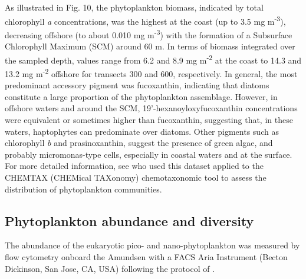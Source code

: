 \documentclass[essd, manuscript]{copernicus}
\begin{document}
As illustrated in Fig. 10, the phytoplankton biomass, indicated by total chlorophyll \textit{a} concentrations, was the highest at the coast (up to 3.5 mg m\textsuperscript{-3}), decreasing offshore (to about 0.010 mg m\textsuperscript{-3})  with the formation of a Subsurface Chlorophyll Maximum (SCM) around 60 m. In terms of biomass integrated over the sampled depth, values range from 6.2 and 8.9 mg m\textsuperscript{-2} at the coast to 14.3 and 13.2 mg m\textsuperscript{-2} offshore for transects 300 and 600, respectively. In general, the most predominant accessory pigment was fucoxanthin, indicating that diatoms constitute a large proportion of the phytoplankton assemblage. However, in offshore waters and around the SCM, 19’-hexanoyloxyfucoxanthin concentrations were equivalent or sometimes higher than fucoxanthin, suggesting that, in these waters, haptophytes can predominate over diatoms. Other pigments such as chlorophyll \textit{b} and prasinoxanthin, suggest the presence of green algae, and probably micromonas-type cells, especially in coastal waters and at the surface. For more detailed information, see \citet{Coupel2015} who used this dataset applied to the CHEMTAX (CHEMical TAXonomy) chemotaxonomic tool to assess the distribution of phytoplankton communities.

\subsection{Phytoplankton abundance and diversity}

The abundance of the eukaryotic pico- and nano-phytoplankton was measured by flow cytometry onboard the Amundsen with a FACS Aria Instrument (Becton Dickinson, San Jose, CA, USA) following the protocol of \citet{Marie1999}. 
\end{document}
